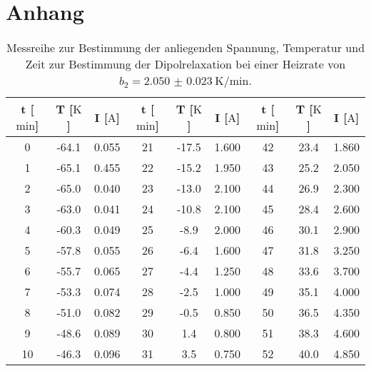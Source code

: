 \newpage
\section{Anhang}

\begin{table}
    \centering
    \caption{Messreihe zur Bestimmung der anliegenden Spannung, \newline Temperatur und Zeit zur Bestimmung der Dipolrelaxation bei einer Heizrate von $b_2 = \SI{2.050(23)}{\kelvin\per\minute}$.} 
    \label{tab:WhoIsBigInJapan?}
    \begin{tabular}{c c c@{\hskip 1cm}||@{\hskip 1cm} c c c@{\hskip 1cm} ||@{\hskip 1cm} c c c}
        \toprule
        t [$\si{\minute}$] & T [$\si{\kelvin}$] &  I [$\si{\ampere}$] & t [$\si{\minute}$] & T [$\si{\kelvin}$] &  I [$\si{\ampere}$] & t [$\si{\minute}$] & T [$\si{\kelvin}$] &  I [$\si{\ampere}$] \\
        \midrule
0    & -64.1   &    0.055 & 21      &  -17.5     &  1.600  &  42  &      23.4  &           1.860 \\
1    & -65.1   &    0.455 & 22      &  -15.2     &  1.950 &  43  &      25.2  &           2.050 \\
2    & -65.0    &    0.040  & 23      &  -13.0       &  2.100  &  44  &      26.9  &           2.300 \\
3    & -63.0     &    0.041 & 24      &  -10.8     &  2.100  &  45  &      28.4  &           2.600  \\
4    & -60.3   &    0.049 & 25      &  -8.9      &  2.000    &  46  &      30.1  &           2.900  \\
5    & -57.8   &    0.055 & 26      &  -6.4      &  1.600  &  47  &      31.8  &           3.250 \\
6    & -55.7   &    0.065 & 27      &  -4.4      &  1.250 &  48  &      33.6  &           3.700  \\
7    & -53.3   &    0.074 & 28      &  -2.5      &  1.000    &  49  &      35.1  &           4.000    \\
8    & -51.0   &    0.082 & 29      &  -0.5      &  0.850 &  50  &      36.5  &           4.350 \\
9    & -48.6   &    0.089 & 30      &  1.4       & 0.800   &  51  &      38.3  &           4.600 \\
10   & -46.3   &    0.096 & 31      &  3.5       & 0.750  &  52  &      40.0    &           4.850 \\

\end{tabular}
\end{table}
